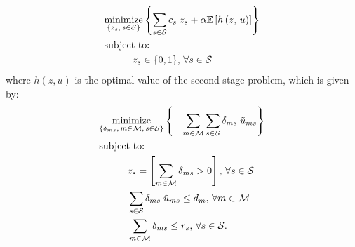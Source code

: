 \documentclass[conference]{IEEEtran}
\begin{document}
\begin{tcolorbox}[floatplacement = !ht, float, title = Problem 1 \\ Two-Stage Stochastic Optimization Program]
\begin{align}
& \underset{\left\{z_s,\, s \in \mathcal{S}\right\}}{\text{minimize}} \left\{ \sum_{s \in \mathcal{S}} c_s \; z_s + \alpha \mathbb{E}\left[ h\left( z,\, u \right) \right] \right\} \nonumber \\
& \text{subject to:}  \nonumber \\
& \hspace{0.4in} z_s \in \{0, 1\},\, \forall s \in \mathcal{S} \nonumber
\end{align}
where $h(z, u)$ is the optimal value of the second-stage problem, which is given by:
\begin{align}
& \underset{\left\{\substack{\delta_{ms},\, m \in \mathcal{M},\, s \in \mathcal{S}}\right\}}{\mathrm{minimize}} \left\{ - \sum_{m \in \mathcal{M}} \sum_{s \in \mathcal{S}} \delta_{ms} \; \tilde{u}_{ms} \right\} \nonumber \\
& \text{subject to:}  \nonumber \\
& \hspace{0.4in} z_s = \left[\sum_{m \in \mathcal{M}} \delta_{ms} > 0\right],\, \forall s \in \mathcal{S} \nonumber \\
& \hspace{0.4in} \sum_{s \in \mathcal{S}} \delta_{ms} \; \tilde{u}_{ms} \leq d_m,\, \forall m \in \mathcal{M} \nonumber \\
& \hspace{0.4in} \sum_{m \in \mathcal{M}} \delta_{ms} \leq r_s,\, \forall s \in \mathcal{S}. \nonumber
\end{align}
\end{tcolorbox}
\end{document}
